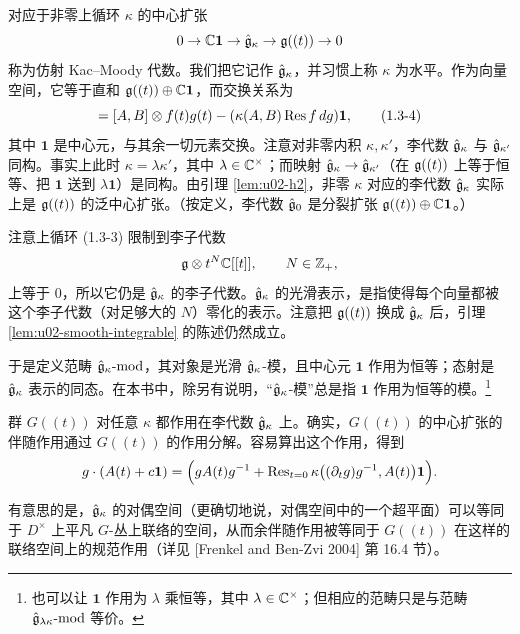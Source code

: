 对应于非零上循环 $\kappa$ 的中心扩张
\[
    0\to\mathbb{C}\mathbf{1}\to\hat{\mathfrak{g}}_\kappa\to\mathfrak{g}((t))\to 0
\]
称为仿射 Kac--Moody 代数。我们把它记作 $\hat{\mathfrak{g}}_\kappa$，并习惯上称 $\kappa$ 为水平。作为向量空间，它等于直和 $\mathfrak{g}((t))\oplus\mathbb{C}\mathbf{1}$，而交换关系为
\begin{equation}
    [A\otimes f(t),B\otimes g(t)]
    =[A,B]\otimes f(t)g(t)-(\kappa(A,B)\Res f\,dg)\mathbf{1},
    \tag{1.3-4}
\end{equation}
其中 $\mathbf{1}$ 是中心元，与其余一切元素交换。注意对非零内积 $\kappa,\kappa'$，李代数 $\hat{\mathfrak{g}}_\kappa$ 与 $\hat{\mathfrak{g}}_{\kappa'}$ 同构。事实上此时 $\kappa=\lambda\kappa'$，其中 $\lambda\in\mathbb{C}^\times$；而映射 $\hat{\mathfrak{g}}_\kappa\to\hat{\mathfrak{g}}_{\kappa'}$（在 $\mathfrak{g}((t))$ 上等于恒等、把 $\mathbf{1}$ 送到 $\lambda\mathbf{1}$）是同构。由引理 \ref{lem:u02-h2}，非零 $\kappa$ 对应的李代数 $\hat{\mathfrak{g}}_\kappa$ 实际上是 $\mathfrak{g}((t))$ 的泛中心扩张。（按定义，李代数 $\hat{\mathfrak{g}}_0$ 是分裂扩张 $\mathfrak{g}((t))\oplus\mathbb{C}\mathbf{1}$。）

注意上循环 (1.3-3) 限制到李子代数
\[
    \mathfrak{g}\otimes t^N\mathbb{C}[[t]],\qquad N\in\mathbb{Z}_+,
\]
上等于 $0$，所以它仍是 $\hat{\mathfrak{g}}_\kappa$ 的李子代数。$\hat{\mathfrak{g}}_\kappa$ 的光滑表示，是指使得每个向量都被这个李子代数（对足够大的 $N$）零化的表示。注意把 $\mathfrak{g}((t))$ 换成 $\hat{\mathfrak{g}}_\kappa$ 后，引理 \ref{lem:u02-smooth-integrable} 的陈述仍然成立。

于是定义范畴 $\hat{\mathfrak{g}}_\kappa\text{-}\mathrm{mod}$，其对象是光滑 $\hat{\mathfrak{g}}_\kappa$-模，且中心元 $\mathbf{1}$ 作用为恒等；态射是 $\hat{\mathfrak{g}}_\kappa$ 表示的同态。在本书中，除另有说明，“$\hat{\mathfrak{g}}_\kappa$-模”总是指 $\mathbf{1}$ 作用为恒等的模。\footnote{也可以让 $\mathbf{1}$ 作用为 $\lambda$ 乘恒等，其中 $\lambda\in\mathbb{C}^\times$；但相应的范畴只是与范畴 $\hat{\mathfrak{g}}_{\lambda\kappa}\text{-}\mathrm{mod}$ 等价。}

群 $G((t))$ 对任意 $\kappa$ 都作用在李代数 $\hat{\mathfrak{g}}_\kappa$ 上。确实，$G((t))$ 的中心扩张的伴随作用通过 $G((t))$ 的作用分解。容易算出这个作用，得到
\[
    g\cdot(A(t)+c\mathbf{1})
    =\Bigl(gA(t)g^{-1}+\operatorname{Res}_{t=0}\kappa\bigl((\partial_tg)g^{-1},A(t)\bigr)\mathbf{1}\Bigr).
\]

有意思的是，$\hat{\mathfrak{g}}_\kappa$ 的对偶空间（更确切地说，对偶空间中的一个超平面）可以等同于 $D^\times$ 上平凡 $G$-丛上联络的空间，从而余伴随作用被等同于 $G((t))$ 在这样的联络空间上的规范作用（详见 [Frenkel and Ben-Zvi 2004] 第 16.4 节）。


